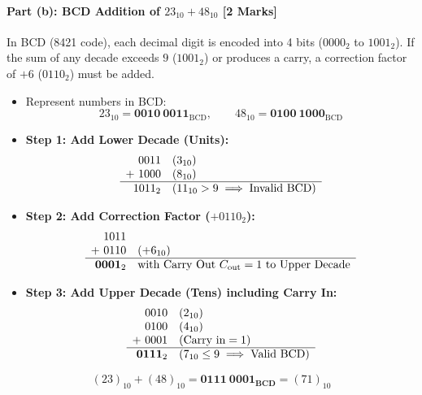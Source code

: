\documentclass[11pt,a4paper,oneside]{book}
\begin{document}
\paragraph{Part (b): BCD Addition of $23_{10} + 48_{10}$ [2 Marks]}
In BCD (8421 code), each decimal digit is encoded into 4 bits ($0000_2$ to $1001_2$). If the sum of any decade exceeds $9$ ($1001_2$) or produces a carry, a correction factor of $+6$ ($0110_2$) must be added.
\begin{itemize}
  \item Represent numbers in BCD:
  \[
  23_{10} = \mathbf{0010\ 0011}_{\text{BCD}}, \qquad 48_{10} = \mathbf{0100\ 1000}_{\text{BCD}}
  \]
  \item \textbf{Step 1: Add Lower Decade (Units):}
  \[
  \begin{array}{r@{\quad}l}
    0011 & (3_{10}) \\
  +\ 1000 & (8_{10}) \\
  \hline
    1011_2 & (11_{10} > 9 \implies \text{Invalid BCD})
  \end{array}
  \]
  \item \textbf{Step 2: Add Correction Factor ($+0110_2$):}
  \[
  \begin{array}{r@{\quad}l}
    1011 & \\
  +\ 0110 & (+6_{10}) \\
  \hline
    \mathbf{0001}_2 & \text{with Carry Out } C_{\text{out}} = 1 \text{ to Upper Decade}
  \end{array}
  \]
  \item \textbf{Step 3: Add Upper Decade (Tens) including Carry In:}
  \[
  \begin{array}{r@{\quad}l}
    0010 & (2_{10}) \\
    0100 & (4_{10}) \\
  +\ 0001 & (\text{Carry in} = 1) \\
  \hline
    \mathbf{0111}_2 & (7_{10} \le 9 \implies \text{Valid BCD})
  \end{array}
  \]
\end{itemize}

\begin{answerbox}
$$(23)_{10} + (48)_{10} = \mathbf{0111\ 0001_{\text{BCD}}} = (71)_{10}$$
\end{answerbox}

\vspace{0.6cm}

\end{document}
